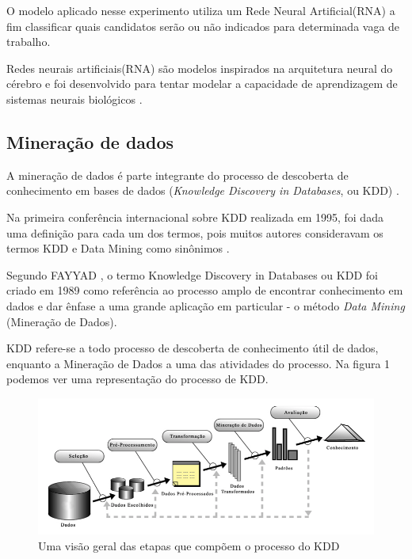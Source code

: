 \documentclass[conference]{IEEEtran}
\begin{document}
    O modelo aplicado nesse experimento utiliza um Rede Neural Artificial(RNA)  a fim classificar quais candidatos serão ou não indicados para determinada vaga de trabalho. 
    	
    Redes neurais artificiais(RNA) são modelos inspirados na arquitetura neural do cérebro e foi desenvolvido para tentar modelar a capacidade de aprendizagem de sistemas neurais biológicos \cite{b4}. 
	
	\subsection{Mineração de dados}
	
	A mineração de dados é parte integrante do processo de descoberta de conhecimento em bases de dados (\textit{Knowledge Discovery in Databases}, ou KDD) \cite{mineracao_nunes}.
	
	Na primeira  conferência internacional sobre KDD realizada em 1995, foi dada uma definição para cada um dos termos, pois muitos autores consideravam os termos KDD e Data Mining como sinônimos \cite{mineracao_nunes}. 
    
    Segundo FAYYAD \cite{kdd}, o termo Knowledge Discovery in Databases ou KDD foi criado em 1989 como referência ao processo amplo de encontrar conhecimento em dados e dar ênfase a uma grande aplicação em particular - o método \textit{Data Mining }(Mineração de Dados).
    
    KDD refere-se a todo processo de descoberta de conhecimento útil de dados, enquanto a Mineração de Dados a uma das atividades do processo. Na figura 1 podemos ver uma representação do processo de KDD.
   
	\begin{figure}[htbp]
	\centerline{\includegraphics[scale=0.3]{imagens/kdd.png}}
	\caption{Uma visão geral das etapas que compõem o processo do KDD}
	
	\label{fig}
	\end{figure}
\end{document}

